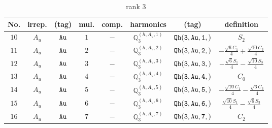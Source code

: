 \documentclass[fleqn,8pt]{jsarticle}
\begin{document}
\begin{table}[ht!]
\begin{center}
\caption{rank 3}
\renewcommand{\arraystretch}{1.3}
\begin{tabular}{cccccccc} \hline \hline
No. & irrep. & (tag) & mul. & comp. & harmonics & (tag) & definition \\ \hline
$ 10 $ & $ A_{u} $ & $ {\tt Au} $ & $ 1 $ & $ - $ & $ \mathbb{Q}_{3}^{(h,A_{u},1)} $ & $ {\tt Qh(3,Au,1,)} $ & $ S_{2} $ \\
$ 11 $ & $ A_{u} $ & $ {\tt Au} $ & $ 2 $ & $ - $ & $ \mathbb{Q}_{3}^{(h,A_{u},2)} $ & $ {\tt Qh(3,Au,2,)} $ & $ - \frac{\sqrt{6} C_{1}}{4} + \frac{\sqrt{10} C_{3}}{4} $ \\
$ 12 $ & $ A_{u} $ & $ {\tt Au} $ & $ 3 $ & $ - $ & $ \mathbb{Q}_{3}^{(h,A_{u},3)} $ & $ {\tt Qh(3,Au,3,)} $ & $ - \frac{\sqrt{6} S_{1}}{4} - \frac{\sqrt{10} S_{3}}{4} $ \\
$ 13 $ & $ A_{u} $ & $ {\tt Au} $ & $ 4 $ & $ - $ & $ \mathbb{Q}_{3}^{(h,A_{u},4)} $ & $ {\tt Qh(3,Au,4,)} $ & $ C_{0} $ \\
$ 14 $ & $ A_{u} $ & $ {\tt Au} $ & $ 5 $ & $ - $ & $ \mathbb{Q}_{3}^{(h,A_{u},5)} $ & $ {\tt Qh(3,Au,5,)} $ & $ - \frac{\sqrt{10} C_{1}}{4} - \frac{\sqrt{6} C_{3}}{4} $ \\
$ 15 $ & $ A_{u} $ & $ {\tt Au} $ & $ 6 $ & $ - $ & $ \mathbb{Q}_{3}^{(h,A_{u},6)} $ & $ {\tt Qh(3,Au,6,)} $ & $ \frac{\sqrt{10} S_{1}}{4} - \frac{\sqrt{6} S_{3}}{4} $ \\
$ 16 $ & $ A_{u} $ & $ {\tt Au} $ & $ 7 $ & $ - $ & $ \mathbb{Q}_{3}^{(h,A_{u},7)} $ & $ {\tt Qh(3,Au,7,)} $ & $ C_{2} $ \\
 \hline \hline
\end{tabular}
\end{center}
\end{table}
\end{document}
